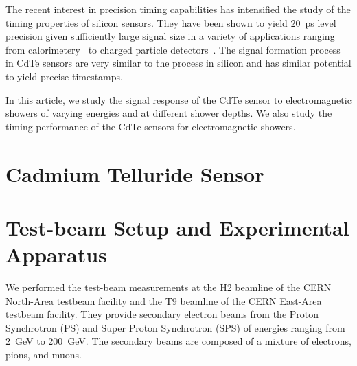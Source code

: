 \documentclass[preprint,1p]{elsarticle}
\begin{document}
The recent interest in precision timing capabilities has intensified
the study of the timing properties of silicon sensors. They have been
shown to yield $20$~ps level precision given sufficiently large signal size
in a variety of applications ranging from calorimetery~\cite{SiliconTiming} to 
charged particle detectors~\cite{santacruz}. The signal formation process
in CdTe sensors are very similar to the process in silicon and has 
similar potential to yield precise timestamps.

In this article, we study the signal response of the CdTe sensor to electromagnetic
showers of varying energies and at different shower depths. We also study the timing
performance of the CdTe sensors for electromagnetic showers.

 
\section{Cadmium Telluride Sensor}
\label{sec:siliconpad}


  
\section{Test-beam Setup and Experimental Apparatus }
\label{sec:tbeam}

We performed the test-beam measurements at the H2 beamline of the CERN North-Area testbeam facility
and the T9 beamline of the CERN East-Area testbeam facility. They provide secondary electron beams 
from the Proton Synchrotron (PS) and Super Proton Synchrotron (SPS)
of energies ranging from $2$~GeV to $200$~GeV. The secondary beams are composed of 
a mixture of electrons, pions, and muons. 
\end{document}
